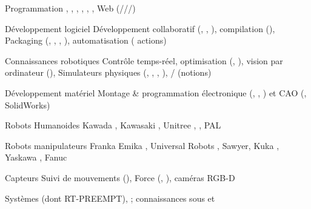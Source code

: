 
\begin{cvskills}

  \cvskill
  {Programmation} %
  {, , , , , \textcolor{lighttext}{, Web
  (///)}} %

  \cvskill
  {Développement logiciel} %
  {Développement collaboratif {(, , \textcolor{lighttext}{})},
    compilation {()}, Packaging {(, , ,
  \textcolor{lighttext}{})}, automatisation ( actions)}

  \cvskill
  {Connaissances robotiques} %
  {Contrôle temps-réel, optimisation (, ), vision par ordinateur (),
    Simulateurs physiques (, , , ),
  \textcolor{lighttext}{/ (notions)}}

  \cvskill
  {Développement matériel} %
  {Montage \& programmation électronique (, , ) et CAO
  (, \textcolor{lighttext}{SolidWorks})}

  \cvskill
  {Robots Humanoides} %
  {Kawada , Kawasaki , Unitree , , PAL }

  \cvskill
  {Robots manipulateurs} %
  {Franka Emika , Universal Robots , Sawyer, Kuka ,
  Yaskawa , Fanuc }

  \cvskill
  {Capteurs} %
  {Suivi de mouvements (), Force (, ), caméras RGB-D}

  \cvskill
  {Systèmes} %
  { \textcolor{lighttext}{(dont RT-PREEMPT)},  ;
  \textcolor{lighttext}{connaissances sous  et }}


\end{cvskills}
